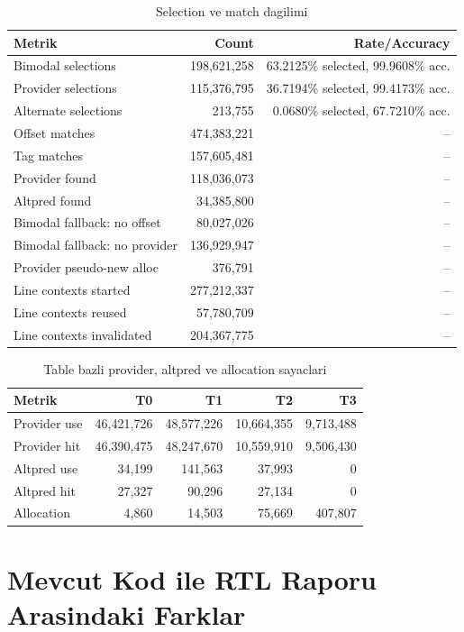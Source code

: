 \documentclass[11pt,a4paper]{article}
\begin{document}
\begin{table}[!htbp]
\centering
\caption{Selection ve match dagilimi}
\label{tab:selection-results}
\small
\begin{tabular}{lrr}
\toprule
Metrik & Count & Rate/Accuracy \\
\midrule
Bimodal selections & 198,621,258 & 63.2125\% selected, 99.9608\% acc. \\
Provider selections & 115,376,795 & 36.7194\% selected, 99.4173\% acc. \\
Alternate selections & 213,755 & 0.0680\% selected, 67.7210\% acc. \\
Offset matches & 474,383,221 & -- \\
Tag matches & 157,605,481 & -- \\
Provider found & 118,036,073 & -- \\
Altpred found & 34,385,800 & -- \\
Bimodal fallback: no offset & 80,027,026 & -- \\
Bimodal fallback: no provider & 136,929,947 & -- \\
Provider pseudo-new alloc & 376,791 & -- \\
Line contexts started & 277,212,337 & -- \\
Line contexts reused & 57,780,709 & -- \\
Line contexts invalidated & 204,367,775 & -- \\
\bottomrule
\end{tabular}
\end{table}

\begin{table}[!htbp]
\centering
\caption{Table bazli provider, altpred ve allocation sayaclari}
\label{tab:table-results}
\small
\begin{tabular}{lrrrr}
\toprule
Metrik & T0 & T1 & T2 & T3 \\
\midrule
Provider use & 46,421,726 & 48,577,226 & 10,664,355 & 9,713,488 \\
Provider hit & 46,390,475 & 48,247,670 & 10,559,910 & 9,506,430 \\
Altpred use & 34,199 & 141,563 & 37,993 & 0 \\
Altpred hit & 27,327 & 90,296 & 27,134 & 0 \\
Allocation & 4,860 & 14,503 & 75,669 & 407,807 \\
\bottomrule
\end{tabular}
\end{table}

\section{Mevcut Kod ile RTL Raporu Arasindaki Farklar}
\end{document}
